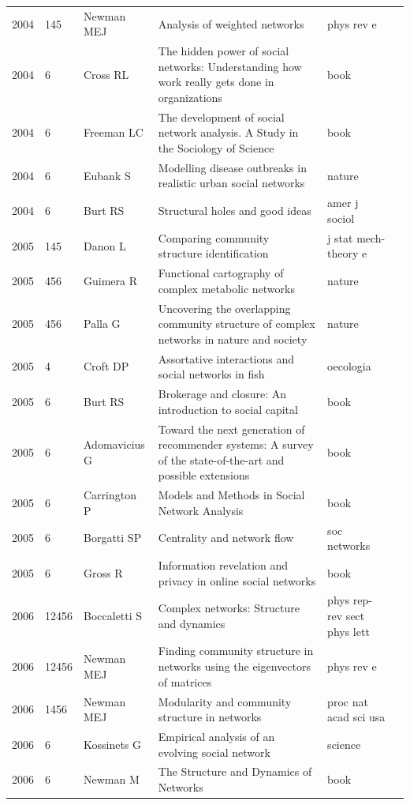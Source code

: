 \documentclass[11pt]{article} %
\begin{document}
\begin{landscape}
\begin{longtable}{p{0.7cm}|p{0.8cm}|p{3cm}|p{14.5cm}|p{3.5cm}l}
2004& 	145& 	 Newman MEJ& 	 Analysis of weighted networks& 	 phys rev e\\
2004& 	6& 	 Cross RL& 	 The hidden power of social networks: Understanding how work really gets done in organizations& 	 book\\
2004& 	6& 	 Freeman LC& 	 The development of social network analysis. A Study in the Sociology of Science& 	 book\\
2004& 	6& 	 Eubank S& 	 Modelling disease outbreaks in realistic urban social networks& 	 nature\\
2004& 	6& 	 Burt RS& 	 Structural holes and good ideas& 	 amer j sociol\\
2005& 	145& 	 Danon L& 	 Comparing community structure identification& 	 j stat mech-theory e\\
2005& 	456& 	 Guimera R& 	 Functional cartography of complex metabolic networks& 	 nature\\
2005& 	456& 	 Palla G& 	 Uncovering the overlapping community structure of complex networks in nature and society& 	 nature\\
2005& 	4& 	 Croft DP& 	 Assortative interactions and social networks in fish& 	 oecologia\\
2005& 	6& 	 Burt RS& 	 Brokerage and closure: An introduction to social capital& 	 book\\
2005& 	6& 	 Adomavicius G& 	 Toward the next generation of recommender systems: A survey of the state-of-the-art and possible extensions& 	 book\\
2005& 	6& 	 Carrington P& 	 Models and Methods in Social Network Analysis& 	 book\\
2005& 	6& 	 Borgatti SP& 	 Centrality and network flow& 	 soc networks\\
2005& 	6& 	 Gross R& 	 Information revelation and privacy in online social networks& 	 book\\
2006& 	12456& 	 Boccaletti S& 	 Complex networks: Structure and dynamics& 	 phys rep-rev sect phys lett\\
2006& 	12456& 	 Newman MEJ& 	 Finding community structure in networks using the eigenvectors of matrices& 	 phys rev e\\
2006& 	1456& 	 Newman MEJ& 	 Modularity and community structure in networks& 	 proc nat acad sci usa\\
2006& 	6& 	 Kossinets G& 	 Empirical analysis of an evolving social network& 	 science\\
2006& 	6& 	 Newman M & 	 The Structure and Dynamics of Networks& 	 book\\

\end{longtable}
\end{landscape}
\end{document}
